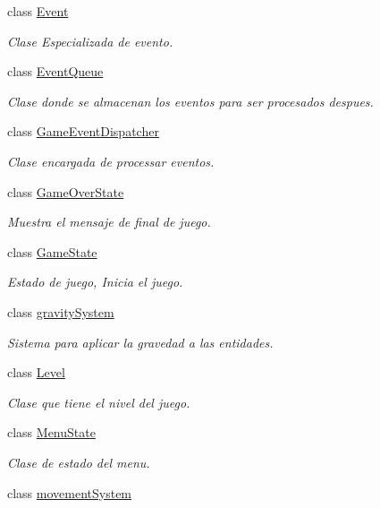 \begin{DoxyCompactItemize}
class \hyperlink{classant_1_1_event}{Event}
\begin{DoxyCompactList}\small\item\em Clase Especializada de evento. \end{DoxyCompactList}\item 
class \hyperlink{classant_1_1_event_queue}{Event\+Queue}
\begin{DoxyCompactList}\small\item\em Clase donde se almacenan los eventos para ser procesados despues. \end{DoxyCompactList}\item 
class \hyperlink{classant_1_1_game_event_dispatcher}{Game\+Event\+Dispatcher}
\begin{DoxyCompactList}\small\item\em Clase encargada de processar eventos. \end{DoxyCompactList}\item 
class \hyperlink{classant_1_1_game_over_state}{Game\+Over\+State}
\begin{DoxyCompactList}\small\item\em Muestra el mensaje de final de juego. \end{DoxyCompactList}\item 
class \hyperlink{classant_1_1_game_state}{Game\+State}
\begin{DoxyCompactList}\small\item\em Estado de juego, Inicia el juego. \end{DoxyCompactList}\item 
class \hyperlink{classant_1_1gravity_system}{gravity\+System}
\begin{DoxyCompactList}\small\item\em Sistema para aplicar la gravedad a las entidades. \end{DoxyCompactList}\item 
class \hyperlink{classant_1_1_level}{Level}
\begin{DoxyCompactList}\small\item\em Clase que tiene el nivel del juego. \end{DoxyCompactList}\item 
class \hyperlink{classant_1_1_menu_state}{Menu\+State}
\begin{DoxyCompactList}\small\item\em Clase de estado del menu. \end{DoxyCompactList}\item 
class \hyperlink{classant_1_1movement_system}{movement\+System}

\end{DoxyCompactItemize}
